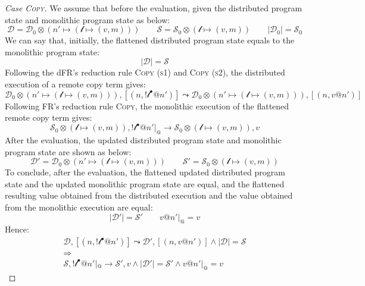 \begin{proof}[Case \textsc{\emph{Copy}}]
We assume that before the evaluation, given the distributed program state and monolithic program state as below:
\[\mathcal{D} = \mathcal{D}_0 \otimes (n' \mapsto (\mathscr{l}\mapsto (v, m)))\quad\quad
\mathcal{S} = \mathcal{S}_0 \otimes (\mathscr{l} \mapsto (v, m)) \quad\quad |\mathcal{D}_0| = \mathcal{S}_0\]
We can say that, initially, the flattened distributed program state equals to the monolithic program state: 
\[|\mathcal{D}| = \mathcal{S}\]
Following the dFR's reduction rule \textsc{Copy (s1)} and \textsc{Copy (s2)}, the distributed execution of a remote copy term gives:
\[\mathcal{D}_0 \otimes (n' \mapsto (\mathscr{l} \mapsto (v,m))) , [(n, !\mathscr{l}^\bullet@n')] \leadsto \mathcal{D}_0 \otimes (n' \mapsto (\mathscr{l} \mapsto (v, m))), [(n, v@n')]\]
Following FR's reduction rule \textsc{Copy}, the monolithic execution of the flattened remote copy term gives:
\[\mathcal{S}_0 \otimes (\mathscr{l} \mapsto (v, m)), !\mathscr{l}^\bullet@n'|_@ \longrightarrow \mathcal{S}_0 \otimes (\mathscr{l} \mapsto (v, m)), v\]
After the evaluation, the updated distributed program state and monolithic program state are shown as below:
\[\mathcal{D}' = \mathcal{D}_0 \otimes (n' \mapsto (\mathscr{l} \mapsto (v, m))) \quad\quad 
\mathcal{S}' = \mathcal{S}_0 \otimes (\mathscr{l} \mapsto (v, m))\]
To conclude, after the evaluation, the flattened updated distributed program state and the updated monolithic program state are equal, and the flattened resulting value obtained from the distributed execution and the value obtained from the monolithic execution are equal:
\[
|\mathcal{D}'| = \mathcal{S}' \quad\quad v@n'|_@ = v
\]
Hence:
\begin{gather*}
\mathcal{D}, [(n, !\mathscr{l}^\bullet@n')] \leadsto \mathcal{D'}, [(n, v@n')] \land |\mathcal{D}| = \mathcal{S} \\\Rightarrow\\ \mathcal{S},  !\mathscr{l}^\bullet@n'|_@ \longrightarrow \mathcal{S'}, v \land |\mathcal{D}'| = \mathcal{S}' \land v@n'|_@ = v
\end{gather*}



\end{proof}
